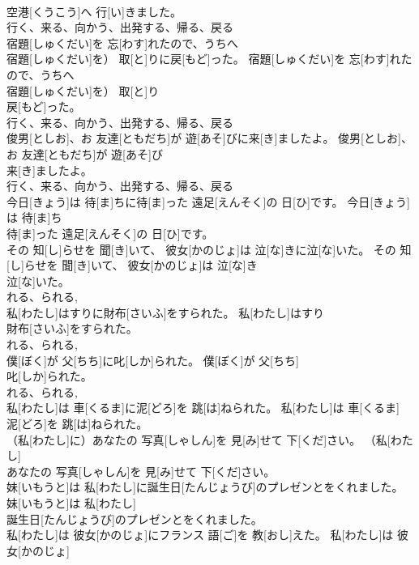 \documentclass[8pt]{extreport}
\begin{document}
\begin{CJK}{UTF8}{min}
\\	空港[くうこう]へ 行[い]きました。	
\\	行く、来る、向かう、出発する、帰る、戻る
\\	宿題[しゅくだい]を 忘[わす]れたので、うちへ
\\	宿題[しゅくだい]を） 取[と]りに戻[もど]った。	宿題[しゅくだい]を 忘[わす]れたので、うちへ
\\	宿題[しゅくだい]を） 取[と]り
\\	戻[もど]った。	
\\	行く、来る、向かう、出発する、帰る、戻る
\\	俊男[としお]、お 友達[ともだち]が 遊[あそ]びに来[き]ましたよ。	俊男[としお]、お 友達[ともだち]が 遊[あそ]び
\\	来[き]ましたよ。	
\\	行く、来る、向かう、出発する、帰る、戻る
\\	今日[きょう]は 待[ま]ちに待[ま]った 遠足[えんそく]の 日[ひ]です。	今日[きょう]は 待[ま]ち
\\	待[ま]った 遠足[えんそく]の 日[ひ]です。	
\\	その 知[し]らせを 聞[き]いて、 彼女[かのじょ]は 泣[な]きに泣[な]いた。	その 知[し]らせを 聞[き]いて、 彼女[かのじょ]は 泣[な]き
\\	泣[な]いた。	
\\	れる、られる, 
\\	私[わたし]はすりに財布[さいふ]をすられた。	私[わたし]はすり
\\	財布[さいふ]をすられた。	
\\	れる、られる, 
\\	僕[ぼく]が 父[ちち]に叱[しか]られた。	僕[ぼく]が 父[ちち]
\\	叱[しか]られた。	
\\	れる、られる, 
\\	私[わたし]は 車[くるま]に泥[どろ]を 跳[は]ねられた。	私[わたし]は 車[くるま]
\\	泥[どろ]を 跳[は]ねられた。	
\\	（私[わたし]に）あなたの 写真[しゃしん]を 見[み]せて 下[くだ]さい。	（私[わたし]
\\	あなたの 写真[しゃしん]を 見[み]せて 下[くだ]さい。	
\\	妹[いもうと]は 私[わたし]に誕生日[たんじょうび]のプレゼンとをくれました。	妹[いもうと]は 私[わたし]
\\	誕生日[たんじょうび]のプレゼンとをくれました。	
\\	私[わたし]は 彼女[かのじょ]にフランス 語[ご]を 教[おし]えた。	私[わたし]は 彼女[かのじょ]

\end{CJK}
\end{document}
